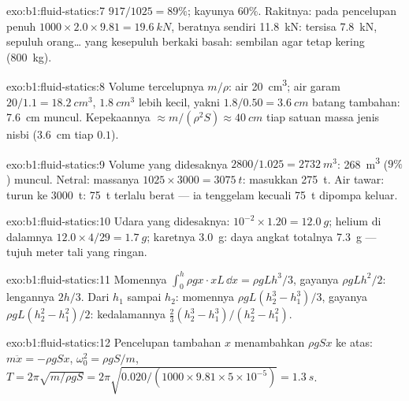 \begin{solution}{exo:b1:fluid-statics:7}
$917/1025 = 89\%$; kayunya $60\%$. Rakitnya:  pada pencelupan penuh $1000 \times
2.0 \times 9.81 = \qty{19.6}{kN}$, beratnya sendiri \qty{11.8}{kN}: tersisa \qty{7.8}{kN},
sepuluh orang\dots{} yang kesepuluh berkaki basah: sembilan agar tetap kering
(\qty{800}{kg}).
\end{solution}

\begin{solution}{exo:b1:fluid-statics:8}
Volume tercelupnya $m/\rho$: air \qty{20}{cm^3}; air garam $20/1.1 = \qty{18.2}{cm^3}$,
$\qty{1.8}{cm^3}$ lebih kecil, yakni $1.8/0.50 = \qty{3.6}{cm}$ batang tambahan: \qty{7.6}{cm}
muncul. Kepekaannya $\approx m/(\rho^2S) \approx \qty{40}{cm}$ tiap satuan massa jenis
nisbi (\qty{3.6}{cm} tiap $0.1$).
\end{solution}

\begin{solution}{exo:b1:fluid-statics:9}
Volume yang didesaknya $2800/1.025 = \qty{2732}{m^3}$: \qty{268}{m^3} ($9\%$)
muncul. Netral: massanya $1025 \times 3000 = \qty{3075}{t}$: masukkan \qty{275}{t}.
Air tawar:  turun ke \qty{3000}{t}: \qty{75}{t} terlalu berat --- ia tenggelam
kecuali \qty{75}{t} dipompa keluar.
\end{solution}

\begin{solution}{exo:b1:fluid-statics:10}
Udara yang didesaknya: $10^{-2} \times 1.20 = \qty{12.0}{g}$; helium di dalamnya $12.0 \times
4/29 = \qty{1.7}{g}$; karetnya \qty{3.0}{g}: daya angkat totalnya \qty{7.3}{g} --- tujuh meter
tali yang ringan.
\end{solution}

\begin{solution}{exo:b1:fluid-statics:11}
Momennya $\int_0^h\rho gx\cdot xL\,\dd x = \rho gLh^3/3$, gayanya $\rho gLh^2/2$:
lengannya $2h/3$. Dari $h_1$ sampai $h_2$: momennya $\rho gL(h_2^3 - h_1^3)/3$, gayanya
$\rho gL(h_2^2 - h_1^2)/2$: kedalamannya $\frac23(h_2^3 - h_1^3)/(h_2^2 - h_1^2)$.
\end{solution}

\begin{solution}{exo:b1:fluid-statics:12}
Pencelupan tambahan $x$ menambahkan  $\rho gSx$ ke atas: $m\ddot x = -\rho gSx$,
$\omega_0^2 = \rho gS/m$, $T = 2\pi\sqrt{m/\rho gS} = 2\pi\sqrt{0.020/(1000 \times
9.81 \times 5\times10^{-5})} = \qty{1.3}{s}$.
\end{solution}

